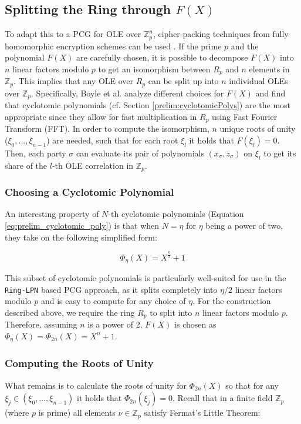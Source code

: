 \subsection{Splitting the Ring through $F(X)$}
\label{subseq:realtiontofx}
To adapt this to a PCG for OLE over $\mathbb{Z}^n_p$, cipher-packing techniques from fully homomorphic encryption schemes can be used \cite{smart2014fully}. If the prime $p$ and the polynomial $F(X)$ are carefully chosen, it is possible to decompose $F(X)$ into $n$ linear factors modulo $p$ to get an isomorphism between $R_p$ and $n$ elements in $\mathbb{Z}_p$. This implies that any OLE over $R_p$ can be split up into $n$ individual OLEs over $\mathbb{Z}_p$. Specifically, Boyle et al. \cite{boyle2020efficient} analyze different choices for $F(X)$ and find that cyclotomic polynomials (cf. Section \ref{prelim:cyclotomicPolys}) are the most appropriate since they allow for fast multiplication in $R_p$ using Fast Fourier Transform (FFT). In order to compute the isomorphism, $n$ unique roots of unity ($\xi_0, ...,\xi_{n-1}$) are needed, such that for each root $\xi_l$ it holds that $F(\xi_l)=0$. Then, each party $\sigma$ can evaluate its pair of polynomials $(x_\sigma, z_\sigma)$ on $\xi_l$ to get its share of the $l$-th OLE correlation in $\mathbb{Z}_p$.

\subsubsection{Choosing a Cyclotomic Polynomial}
An interesting property of $N$-th cyclotomic polynomials (Equation \ref{eq:prelim_cyclotomic_poly}) is that when $N=\eta$ for $\eta$ being a power of two, they take on the following simplified form:

\begin{equation}
\label{eq:choosingfx}
\Phi_\eta(X)= X^\frac{\eta}{2} + 1
\end{equation}

This subset of cyclotomic polynomials is particularly well-suited for use in the \texttt{Ring-LPN} based PCG approach, as it splits completely into $\eta/2$ linear factors modulo $p$ and is easy to compute for any choice of $\eta$. For the construction described above, we require the ring $R_p$ to split into $n$ linear factors modulo $p$. Therefore, assuming $n$ is a power of 2, $F(X)$ is chosen as $\Phi_\eta(X) = \Phi_{2n}(X) = X^n + 1$.

\subsubsection{Computing the Roots of Unity}
What remains is to calculate the roots of unity for $\Phi_{2n}(X)$ so that for any $\xi_j \in (\xi_0, \ldots, \xi_{n-1})$ it holds that $\Phi_{2n}(\xi_j) = 0$. Recall that in a finite field  $\mathbb{Z}_p$ (where $p$ is prime) all elements $\nu \in \mathbb{Z}_p$ satisfy Fermat's Little Theorem:

